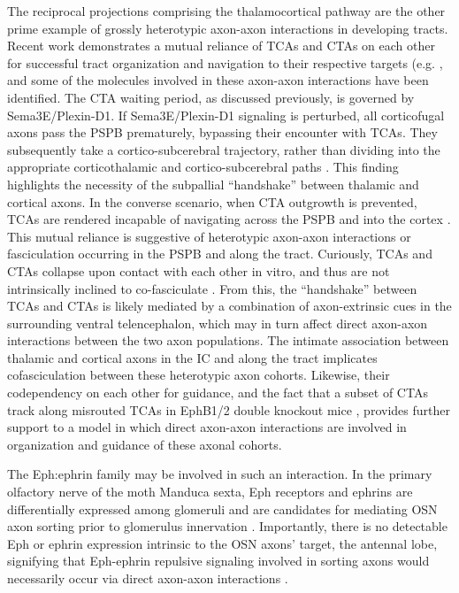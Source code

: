 The reciprocal projections comprising the thalamocortical pathway are the other prime example of grossly heterotypic axon-axon interactions in developing tracts.
Recent work demonstrates a mutual reliance of TCAs and CTAs on each other for successful tract organization and navigation to their respective targets (e.g. \cite{chen2012evidence,deck2013pathfinding}, and some of the molecules involved in these axon-axon interactions have been identified.
The CTA waiting period, as discussed previously, is governed by Sema3E/Plexin-D1.
If Sema3E/Plexin-D1 signaling is perturbed, all corticofugal axons pass the PSPB prematurely, bypassing their encounter with TCAs.
They subsequently take a cortico-subcerebral trajectory, rather than dividing into the appropriate corticothalamic and cortico-subcerebral paths \cite{deck2013pathfinding}.
This finding highlights the necessity of the subpallial “handshake” between thalamic and cortical axons.
In the converse scenario, when CTA outgrowth is prevented, TCAs are rendered incapable of navigating across the PSPB and into the cortex \cite{chen2012evidence}.
This mutual reliance is suggestive of heterotypic axon-axon interactions or fasciculation occurring in the PSPB and along the tract.
Curiously, TCAs and CTAs collapse upon contact with each other in vitro, and thus are not intrinsically inclined to co-fasciculate \cite{bagnard2001axonal}.
From this, the “handshake” between TCAs and CTAs is likely mediated by a combination of axon-extrinsic cues in the surrounding ventral telencephalon, which may in turn affect direct axon-axon interactions between the two axon populations.
The intimate association between thalamic and cortical axons in the IC and along the tract \cite{molnar1998mechanisms} implicates cofasciculation between these heterotypic axon cohorts.
Likewise, their codependency on each other for guidance, and the fact that a subset of CTAs track along misrouted TCAs in EphB1/2 double knockout mice \cite{robichaux2014ephb}, provides further support to a model in which direct axon-axon interactions are involved in organization and guidance of these axonal cohorts.

The Eph:ephrin family may be involved in such an interaction.
In the primary olfactory nerve of the moth Manduca sexta, Eph receptors and ephrins are differentially expressed among glomeruli and are candidates for mediating OSN axon sorting prior to glomerulus innervation \cite{kaneko2003interaxonal}.
Importantly, there is no detectable Eph or ephrin expression intrinsic to the OSN axons’ target, the antennal lobe, signifying that Eph-ephrin repulsive signaling involved in sorting axons would necessarily occur via direct axon-axon interactions \cite{kaneko2003interaxonal}.

